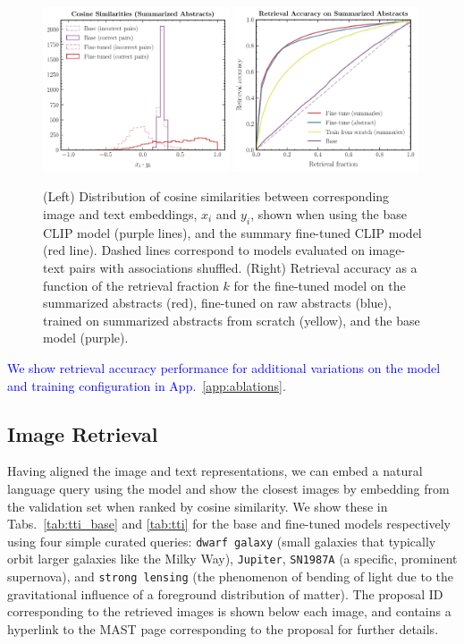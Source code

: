 \documentclass[10pt]{article} %
\newcommand{\changes}[1]{\textcolor{blue}{#1}}
\begin{document}
\begin{figure}[!h]
  \includegraphics[width=0.49\textwidth]{plots/sim_val.pdf}
  \includegraphics[width=0.49\textwidth]{plots/retrieval.pdf}
  \caption{(Left) Distribution of cosine similarities between corresponding image and text embeddings, $x_i$ and $y_i$, shown when using the base CLIP model (purple lines), and the summary fine-tuned CLIP model (red line). Dashed lines correspond to models evaluated on image-text pairs with associations shuffled. (Right) Retrieval accuracy as a function of the retrieval fraction $k$ for the fine-tuned model on the summarized abstracts (red), fine-tuned on raw abstracts (blue), trained on summarized abstracts from scratch (yellow), and the base model (purple).}
  \label{fig:sim_valtrain}
  \end{figure}

\changes{We show retrieval accuracy performance for additional variations on the model and training configuration in App.~\ref{app:ablations}.}


\subsection{Image Retrieval}

Having aligned the image and text representations, we can embed a natural language query using the model and show the closest images by embedding from the validation set when ranked by cosine similarity.
%
We show these in Tabs.~\ref{tab:tti_base} and \ref{tab:tti} for the base and fine-tuned models respectively using four simple curated queries: \texttt{dwarf galaxy} (small galaxies that typically orbit larger galaxies like the Milky Way), \texttt{Jupiter},  \texttt{SN1987A} (a specific, prominent supernova), and \texttt{strong lensing} (the phenomenon of bending of light due to the gravitational influence of a foreground distribution of matter). The proposal ID corresponding to the retrieved images is shown below each image, and contains a hyperlink to the MAST page corresponding to the proposal for further details.
\end{document}
